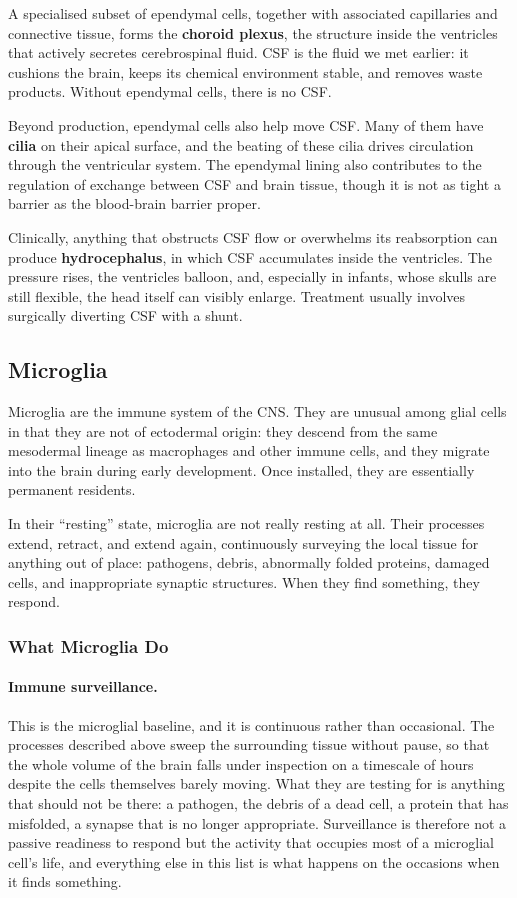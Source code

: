 \documentclass[11pt]{article}
\begin{document}
A specialised subset of ependymal cells, together with associated capillaries and connective tissue, forms the \textbf{choroid plexus}, the structure inside the ventricles that actively secretes cerebrospinal fluid. CSF is the fluid we met earlier: it cushions the brain, keeps its chemical environment stable, and removes waste products. Without ependymal cells, there is no CSF.

Beyond production, ependymal cells also help move CSF. Many of them have \textbf{cilia} on their apical surface, and the beating of these cilia drives circulation through the ventricular system. The ependymal lining also contributes to the regulation of exchange between CSF and brain tissue, though it is not as tight a barrier as the blood-brain barrier proper.

Clinically, anything that obstructs CSF flow or overwhelms its reabsorption can produce \textbf{hydrocephalus}, in which CSF accumulates inside the ventricles. The pressure rises, the ventricles balloon, and, especially in infants, whose skulls are still flexible, the head itself can visibly enlarge. Treatment usually involves surgically diverting CSF with a shunt.

\subsection{Microglia}

Microglia are the immune system of the CNS. They are unusual among glial cells in that they are not of ectodermal origin: they descend from the same mesodermal lineage as macrophages and other immune cells, and they migrate into the brain during early development. Once installed, they are essentially permanent residents.

In their ``resting'' state, microglia are not really resting at all. Their processes extend, retract, and extend again, continuously surveying the local tissue for anything out of place: pathogens, debris, abnormally folded proteins, damaged cells, and inappropriate synaptic structures. When they find something, they respond.

\subsubsection{What Microglia Do}

\paragraph{Immune surveillance.} This is the microglial baseline, and it is continuous rather than occasional. The processes described above sweep the surrounding tissue without pause, so that the whole volume of the brain falls under inspection on a timescale of hours despite the cells themselves barely moving. What they are testing for is anything that should not be there: a pathogen, the debris of a dead cell, a protein that has misfolded, a synapse that is no longer appropriate. Surveillance is therefore not a passive readiness to respond but the activity that occupies most of a microglial cell's life, and everything else in this list is what happens on the occasions when it finds something.
\end{document}

